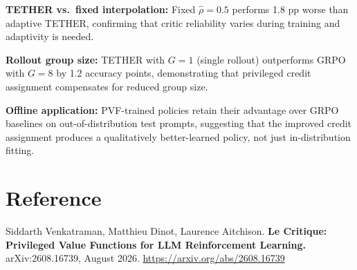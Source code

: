 \documentclass[10pt,twocolumn]{article}
\begin{document}
\textbf{TETHER vs.\ fixed interpolation:} Fixed $\hat{\rho}=0.5$
performs 1.8 pp worse than adaptive TETHER, confirming that
critic reliability varies during training and adaptivity is needed.

\textbf{Rollout group size:} TETHER with $G=1$ (single rollout)
outperforms GRPO with $G=8$ by 1.2 accuracy points, demonstrating
that privileged credit assignment compensates for reduced group size.

\textbf{Offline application:} PVF-trained policies retain their
advantage over GRPO baselines on out-of-distribution test
prompts, suggesting that the improved credit assignment produces
a qualitatively better-learned policy, not just in-distribution
fitting.

\section*{Reference}

Siddarth Venkatraman, Matthieu Dinot, Laurence Aitchison.
\textbf{Le Critique: Privileged Value Functions for LLM
Reinforcement Learning.}
arXiv:2608.16739, August 2026.
\url{https://arxiv.org/abs/2608.16739}
\end{document}
